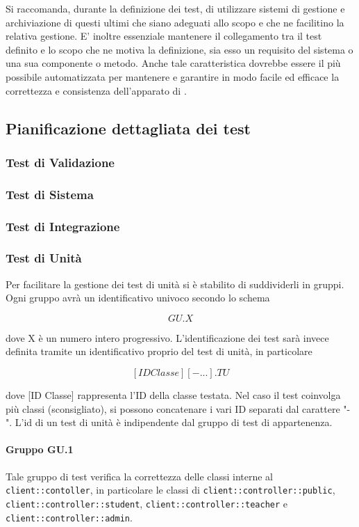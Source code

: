 \documentclass[12pt,a4paper]{article}
\begin{document}
Si raccomanda, durante la definizione dei test, di utilizzare sistemi di gestione e archiviazione di questi ultimi che siano adeguati allo scopo e che ne facilitino la relativa gestione. E' inoltre essenziale mantenere il collegamento tra il test definito e lo scopo che ne motiva la definizione, sia esso un requisito del sistema o una sua componente o metodo. Anche tale caratteristica dovrebbe essere il più possibile automatizzata per mantenere e garantire in modo facile ed efficace la correttezza e consistenza dell'apparato di .

\subsection{Pianificazione dettagliata dei test}\label{test_pianificazione}

\subsubsection{Test di Validazione}\label{test_validazione}
\subsubsection{Test di Sistema}\label{test_sistema}
\subsubsection{Test di Integrazione}\label{test_integrazione}
\subsubsection{Test di Unità}\label{test_unita}

Per facilitare la gestione dei test di unità si è stabilito di suddividerli in gruppi. Ogni gruppo avrà un identificativo univoco secondo lo schema

\[ GU.X  \]

dove X è un numero intero progressivo. L'identificazione dei test sarà invece definita tramite un identificativo proprio del test di unità, in particolare

\[ [ID Classe][- ...].TU \] 

dove [ID Classe] rappresenta l'ID della classe testata. Nel caso il test coinvolga più classi (sconsigliato), si possono concatenare i vari ID separati dal carattere "-".
L'id di un test di unità è indipendente dal gruppo di test di appartenenza.

\paragraph{Gruppo GU.1}
Tale gruppo di test verifica la correttezza delle classi interne al  \texttt{client::contoller}, in particolare le classi di \texttt{client::controller::public}, \texttt{client::controller::student}, \texttt{client::controller::teacher} e \texttt{client::controller::admin}.
\end{document}
